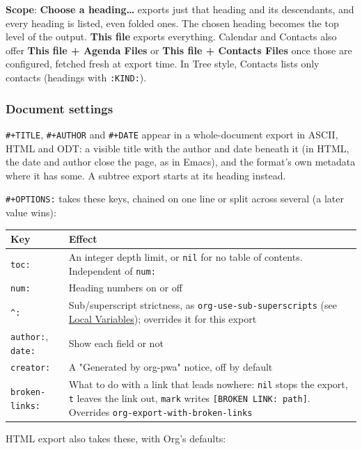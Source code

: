 \documentclass[11pt]{article}
\begin{document}
\textbf{Scope}: \textbf{Choose a heading…} exports just that heading and its descendants, and every heading is listed, even folded ones. The chosen heading becomes the top level of the output. \textbf{This file} exports everything. Calendar and Contacts also offer \textbf{This file + Agenda Files} or \textbf{This file + Contacts Files} once those are configured, fetched fresh at export time. In Tree style, Contacts lists only contacts (headings with \texttt{:KIND:}).

\subsubsection{Document settings}
\label{sec:orgc871d07}

\texttt{\#+TITLE}, \texttt{\#+AUTHOR} and \texttt{\#+DATE} appear in a whole-document export in ASCII, HTML and ODT: a visible title with the author and date beneath it (in HTML, the date and author close the page, as in Emacs), and the format's own metadata where it has some. A subtree export starts at its heading instead.

\texttt{\#+OPTIONS:} takes these keys, chained on one line or split across several (a later value wins):

\begin{center}
\begin{tabular}{ll}
Key & Effect\\[0pt]
\hline
\texttt{toc:} & An integer depth limit, or \texttt{nil} for no table of contents. Independent of \texttt{num:}\\[0pt]
\texttt{num:} & Heading numbers on or off\\[0pt]
\texttt{\textasciicircum{}:} & Sub/superscript strictness, as \texttt{org-use-sub-superscripts} (see \hyperref[sec:org761a631]{Local Variables}); overrides it for this export\\[0pt]
\texttt{author:}, \texttt{date:} & Show each field or not\\[0pt]
\texttt{creator:} & A "Generated by org-pwa" notice, off by default\\[0pt]
\texttt{broken-links:} & What to do with a link that leads nowhere: \texttt{nil} stops the export, \texttt{t} leaves the link out, \texttt{mark} writes \texttt{[BROKEN LINK: path]}. Overrides \texttt{org-export-with-broken-links}\\[0pt]
\end{tabular}
\end{center}

HTML export also takes these, with Org's defaults:
\end{document}
